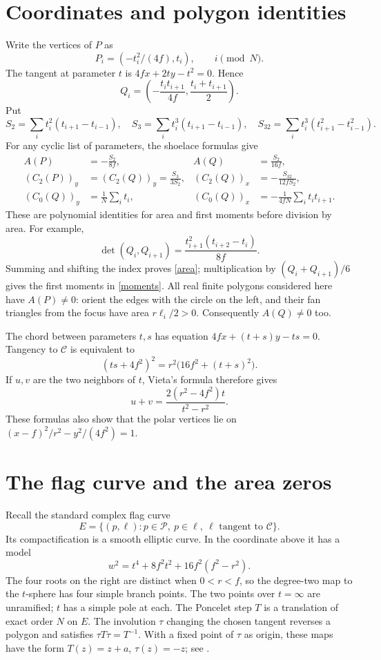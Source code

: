 \documentclass[11pt]{article}
\begin{document}
\section*{Coordinates and polygon identities}
Write the vertices of $P$ as
\[
 P_i=(-t_i^2/(4f),t_i),\qquad i\pmod N.
\]
The tangent at parameter $t$ is $4fx+2ty-t^2=0$. Hence
\begin{equation}\label{polar}
 Q_i=\left(-\frac{t_i t_{i+1}}{4f},
                 \frac{t_i+t_{i+1}}2\right).
\end{equation}
Put
\[
 S_2=\sum_i t_i^2(t_{i+1}-t_{i-1}),\quad
 S_3=\sum_i t_i^3(t_{i+1}-t_{i-1}),\quad
 S_{32}=\sum_i t_i^3(t_{i+1}^2-t_{i-1}^2).
\]
For any cyclic list of parameters, the shoelace formulas give
\begin{align}
 A(P)&=-\frac{S_2}{8f},& A(Q)&=\frac{S_2}{16f},\label{area}\\
 (C_2(P))_y&=(C_2(Q))_y=\frac{S_3}{3S_2},&
 (C_2(Q))_x&=-\frac{S_{32}}{12fS_2},\label{moments}\\
 (C_0(Q))_y&=\frac1N\sum_i t_i,&
 (C_0(Q))_x&=-\frac1{4fN}\sum_i t_i t_{i+1}.\label{vertex}
\end{align}
These are polynomial identities for area and first moments before
division by area. For example,
\[
 \det(Q_i,Q_{i+1})
 =\frac{t_{i+1}^2(t_{i+2}-t_i)}{8f}.
\]
Summing and shifting the index proves \eqref{area}; multiplication
by $(Q_i+Q_{i+1})/6$ gives the first moments in \eqref{moments}.
All real finite polygons considered here have $A(P)\ne0$: orient
the edges with the circle on the left, and their fan triangles from
the focus have area $r\ell_i/2>0$. Consequently $A(Q)\ne0$ too.

The chord between parameters $t,s$ has equation
$4fx+(t+s)y-ts=0$. Tangency to $\mathcal C$ is equivalent to
\begin{equation}\label{chord}
 (ts+4f^2)^2=r^2\bigl(16f^2+(t+s)^2\bigr).
\end{equation}
If $u,v$ are the two neighbors of $t$, Vieta's formula therefore gives
\begin{equation}\label{vieta}
 u+v=\frac{2(r^2-4f^2)t}{t^2-r^2}.
\end{equation}
These formulas also show that the polar vertices lie on
$ (x-f)^2/r^2-y^2/(4f^2)=1$.

\section*{The flag curve and the area zeros}
Recall the standard complex flag curve
\[
 E=\{(p,\ell):p\in\mathcal P,\ p\in\ell,
                    \ \ell\text{ tangent to }\mathcal C\}.
\]
Its compactification is a smooth elliptic curve. In the coordinate
above it has a model
\[
 w^2=t^4+8f^2t^2+16f^2(f^2-r^2).
\]
The four roots on the right are distinct when $0<r<f$, so the
degree-two map to the $t$-sphere has four simple branch points.
The two points over $t=\infty$ are unramified; $t$ has a simple
pole at each. The Poncelet step $T$ is a translation of exact order
$N$ on $E$. The involution $\tau$ changing the chosen tangent
reverses a polygon and satisfies $\tau T\tau=T^{-1}$. With a fixed
point of $\tau$ as origin, these maps have the form
$T(z)=z+a$, $\tau(z)=-z$; see \cite[Section 3]{ST}.
\end{document}
